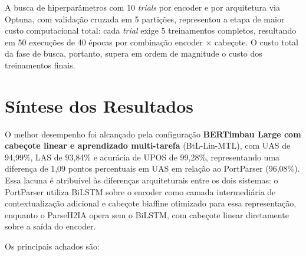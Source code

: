 A busca de hiperparâmetros com 10 \textit{trials} por encoder e por arquitetura via Optuna,
com validação cruzada em 5 partições, representou a etapa de maior custo computacional total:
cada \textit{trial} exige 5 treinamentos completos, resultando em 50 execuções de 40 épocas
por combinação encoder × cabeçote. O custo total da fase de busca, portanto, supera em
ordem de magnitude o custo dos treinamentos finais.

\section{Síntese dos Resultados}
\label{sec:sintese}

O melhor desempenho foi alcançado pela configuração \textbf{BERTimbau Large com cabeçote
linear e aprendizado multi-tarefa} (BtL-Lin-MTL), com UAS de 94,99\%, LAS de 93,84\% e
acurácia de UPOS de 99,28\%, representando uma diferença de 1,09 pontos percentuais em UAS
em relação ao PortParser (96,08\%). Essa lacuna é atribuível às diferenças arquiteturais
entre os dois sistemas: o PortParser utiliza BiLSTM sobre o encoder como camada intermediária
de contextualização adicional e cabeçote biaffine otimizado para essa representação, enquanto
o ParseH2IA opera sem o BiLSTM, com cabeçote linear diretamente sobre a saída do encoder.

Os principais achados são:

